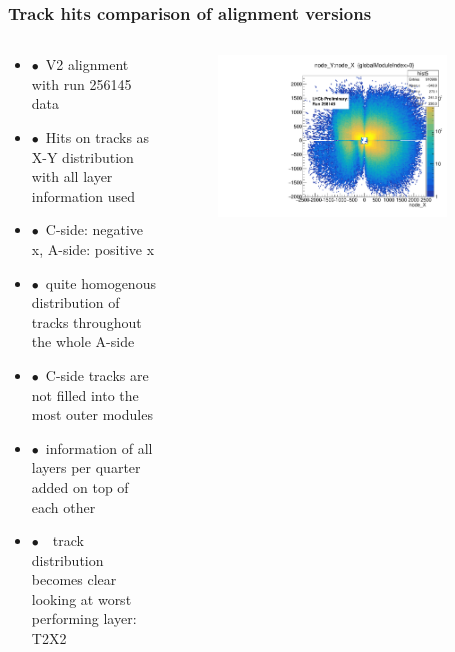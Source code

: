 \documentclass[aspectratio=1610, 12pt]{beamer}
\begin{document}
\begin{frame}\frametitle{Track hits comparison of alignment versions}
  \begin{columns}
    \begin{column}[c]{0.48\textwidth}
      \begin{itemize}
        \item $\bullet$\, V2 alignment with run 256145 data
        \item $\bullet$\, Hits on tracks as X-Y distribution with all layer information used
        \item $\bullet$\, C-side: negative x, A-side: positive x
        \item $\bullet$\, quite homogenous distribution of tracks throughout the whole A-side
        \item $\bullet$\, C-side tracks are not filled into the most outer modules
        \item $\bullet$\, information of all layers per quarter added on top of each other
        \item $\bullet$\, \to\, track distribution becomes clear looking at worst performing layer: T2X2
      \end{itemize}
    \end{column}
    \begin{column}[c]{0.48\textwidth}
      \begin{figure}
        \centering
        \includegraphics[width=0.9\textwidth]{tuples_out/combining_2D_nodeXY_v2.pdf}%
      \end{figure}
    \end{column}
  \end{columns}
\end{frame}
\end{document}
